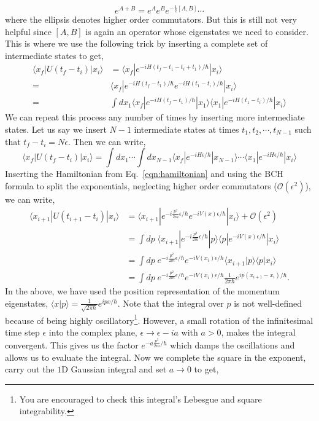 \documentclass[11pt]{article}
\newcommand{\sidefact}[1]{\marginnote{\footnotesize\textcolor{green!50!black}{#1}}}
\theoremstyle{definition}
\begin{document}
\begin{equation}
e^{A+B} = e^A e^B e^{-\frac{1}{2}[A,B]}  \cdots
\end{equation}
where the ellipsis denotes higher order commutators. But this is still not very helpful since $[A,B]$ is again an operator whose eigenstates we need to consider. This is where we use the following trick by inserting a complete set of intermediate states to get,
\begin{align}
  \langle x_f |U(t_f-t_i)| x_i \rangle &= \langle x_f | e^{-iH(t_f -t_1 - t_i + t_1)/\hbar} | x_i \rangle \\
=& \langle x_f | e^{-iH(t_f -t_1)/\hbar} e^{-iH(t_1 - t_i)/\hbar} | x_i \rangle  \\
=& \int dx_1 \langle x_f | e^{-iH(t_f -t_1)/\hbar} | x_1 \rangle \langle x_1 | e^{-iH(t_1 - t_i)/\hbar} | x_i \rangle 
\end{align}
We can repeat this process any number of times by inserting more intermediate states. Let us say we insert $N-1$ intermediate states at times $t_1, t_2, \cdots, t_{N-1}$ such that $t_f-t_i = N \epsilon$. Then we can write,
\begin{equation}\label{eqn:full_transamp}
\langle x_f |U(t_f-t_i)| x_i \rangle = \int dx_1 \cdots \int dx_{N-1} \langle x_f | e^{-iH\epsilon/\hbar} | x_{N-1} \rangle \cdots \langle x_1 | e^{-iH\epsilon/\hbar} | x_i \rangle
\end{equation}
Inserting the Hamiltonian from Eq.~\eqref{eqn:hamiltonian} and using the BCH formula to split the exponentials, neglecting higher order commutators ($\mathcal{O}(\epsilon^2)$), we can write,
\begin{align}
\langle x_{i+1} |U(t_{i+1}-t_i)| x_i \rangle &= \langle x_{i+1} | e^{-i\frac{p^2}{2 m}\epsilon/\hbar} e^{-iV(x)\epsilon/\hbar} | x_i \rangle + \mathcal{O}(\epsilon^2) \nonumber \\ 
&= \int  dp \;\langle x_{i+1} | e^{-i\frac{p^2}{2 m}\epsilon/\hbar} | p \rangle \langle p | e^{-iV(x)\epsilon/\hbar} | x_i \rangle  \nonumber \\
&= \int  dp \; e^{-i\frac{p^2}{2 m}\epsilon/\hbar} e^{-iV(x_i)\epsilon/\hbar} \langle x_{i+1} | p \rangle \langle p | x_i \rangle \nonumber \\
&= \int dp \;e^{-i\frac{p^2}{2 m}\epsilon/\hbar} e^{-iV(x_i)\epsilon/\hbar} \frac{1}{2\pi \hbar} e^{ip(x_{i+1}-x_i)/\hbar}. 
\end{align}
In the above, we have used the position representation\sidefact{The more accurate term is configuration space, but we have used position space for readability.} of the momentum eigenstates, $\langle x | p \rangle = \frac{1}{\sqrt{2\pi \hbar}} e^{ipx/\hbar}$. Note that the integral over $p$ is not well-defined because of being highly oscillatory\footnote{You are encouraged to check this integral's Lebesgue and square integrability.}. However, a small rotation of the infinitesimal time step $\epsilon$ into the complex plane, $\epsilon \to \epsilon - i a$ with $a > 0$, makes the integral convergent. This gives us the factor $e^{-a\frac{p^2}{2 m}/\hbar}$ which damps the oscillations and allows us to evaluate the integral. Now we complete the square in the exponent, carry out the $1$D Gaussian integral and set $a \to 0$ to get,
\end{document}
